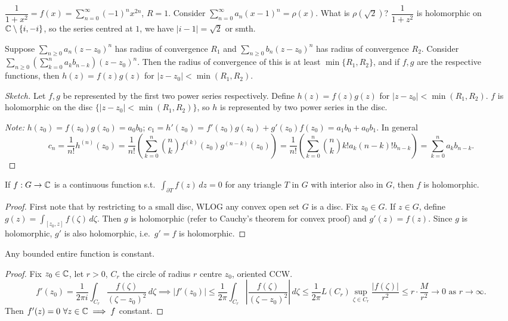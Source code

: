 \documentclass[11pt]{article}
\begin{document}
\begin{example}
$\dfrac{1}{1+x^2} = f(x) = \sum_{n=0}^\infty (-1)^nx^{2n}$, $R=1$. Consider $\sum_{n=0}^\infty a_n(x-1)^n = \rho(x)$. What is $\rho(\sqrt2)$? $\dfrac{1}{1+z^2}$ is holomorphic on ${\mathbb{C}}\setminus\{i,-i\}$, so the series centred at $1$, we have $|i-1|=\sqrt2$ or smth.
\end{example}

\begin{example}
Suppose $\sum_{n\ge0} a_n(z-z_0)^n$ has radius of convergence $R_1$ and $\sum_{n\ge0} b_n(z-z_0)^n$ has radius of convergence $R_2$. Consider $\sum_{n\ge0}\left(\sum_{k=0}^n a_kb_{n-k}\right)(z-z_0)^n$. Then the radius of convergence of this is at least $\min\{R_1,R_2\}$, and if $f,g$ are the respective functions, then $h(z) = f(z)g(z)$ for $|z-z_0| < \min(R_1,R_2)$.
\end{example}

\begin{proof}[Sketch]
Let $f,g$ be represented by the first two power series respectively. Define $h(z) = f(z)g(z)$ for $|z-z_0| < \min(R_1,R_2)$. $f$ is holomorphic on the disc $\{|z-z_0|<\min(R_1,R_2)\}$, so $h$ is represented by two power series in the disc.

\emph{Note:} $h(z_0)=f(z_0)g(z_0)=a_0b_0$; $c_1 = h'(z_0) = f'(z_0)g(z_0)+g'(z_0)f(z_0) = a_1b_0+a_0b_1$. In general
\[
c_n = \frac{1}{n!}h^{(n)}(z_0) = \frac{1}{n!}\left(\sum_{k=0}^n \binom{n}{k} f^{(k)}(z_0)g^{(n-k)}(z_0)\right) = \frac{1}{n!}\left(\sum_{k=0}^n \binom{n}{k} k!a_k(n-k)!b_{n-k}\right) = \sum_{k=0}^n a_kb_{n-k}.
\]
\end{proof}

\begin{theorem}
If $f: G \to {\mathbb{C}}$ is a continuous function s.t.\ $\int_{\partial T} f(z)\,dz = 0$ for any triangle $T$ in $G$ with interior also in $G$, then $f$ is holomorphic.
\end{theorem}
\begin{proof}
First note that by restricting to a small disc, WLOG any convex open set $G$ is a disc. Fix $z_0\in G$. If $z\in G$, define $g(z) = \int_{[z_0,z]} f(\zeta)\,d\zeta$. Then $g$ is holomorphic (refer to Cauchy's theorem for convex proof) and $g'(z)=f(z)$. Since $g$ is holomorphic, $g'$ is also holomorphic, i.e.\ $g'=f$ is holomorphic.
\end{proof}

\begin{theorem}
Any bounded entire function is constant.
\end{theorem}
\begin{proof}
Fix $z_0\in{\mathbb{C}}$, let $r>0$, $C_r$ the circle of radius $r$ centre $z_0$, oriented CCW.
\[
f'(z_0) = \frac{1}{2\pi i}\int_{C_r} \frac{f(\zeta)}{(\zeta-z_0)^2}\,d\zeta \implies |f'(z_0)| \le \frac{1}{2\pi}\int_{C_r} \left|\frac{f(\zeta)}{(\zeta-z_0)^2}\right|\,d\zeta \le \frac{1}{2\pi}L(C_r)\sup_{\zeta\in C_r}\frac{|f(\zeta)|}{r^2} \le r\cdot\frac{M}{r^2} \to 0 \text{ as } r\to\infty.
\]
Then $f'(z)=0\ \forall z\in{\mathbb{C}} \implies f$ constant.
\end{proof}
\end{document}
